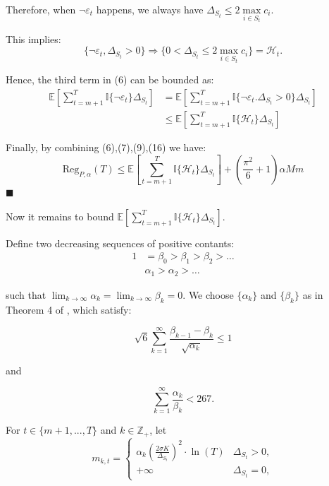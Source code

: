 \documentclass[opre,sglanonrev]{informs4}
\begin{document}
Therefore, when $\lnot \varepsilon_t$ happens, we always have $\Delta_{S_t}\leq 2\mathop{\max}\limits_{i\in S_t}c_i$.

This implies:
$$
	\{\lnot \varepsilon_t, \Delta_{S_t}>0\}\Longrightarrow \{0<\Delta_{S_t}\leq 2\mathop{\max}\limits_{i\in S_t}c_i\}=\mathcal{H}_t.
$$

Hence, the third term in (6) can be bounded as:
\begin{equation}
	\begin{aligned}
		\mathbb{E}[\sum_{t=m+1}^{T}\mathbb{I}\{\lnot \varepsilon_t\}\Delta_{S_t}] &= \mathbb{E}[\sum_{t=m+1}^{T}\mathbb{I}\{\lnot \varepsilon_t. \Delta_{S_t}>0\}\Delta_{S_t}]\\
		&\leq \mathbb{E}[\sum_{t=m+1}^{T}\mathbb{I}\{\mathcal{H}_t\}\Delta_{S_t}]
	\end{aligned}
\end{equation}

Finally, by combining (6),(7),(9),(16) we have:
$$
	\text{Reg}_{P,\alpha}(T) \leq \mathbb{E}[\sum_{t=m+1}^{T}\mathbb{I}\{\mathcal{H}_t\}\Delta_{S_t}] + (\frac{\pi^2}{6}+1)\alpha M m
$$
\hfill $\blacksquare$

Now it remains to bound $\mathbb{E}[\sum_{t=m+1}^{T}\mathbb{I}\{\mathcal{H}_t\}\Delta_{S_t}]$.

Define two decreasing sequences of positive contants:
$$\begin{aligned}
1 & =\beta_0>\beta_1>\beta_2>\ldots \\
 & \alpha_1>\alpha_2>\ldots
\end{aligned}$$

such that $\lim_{k \to \infty}\alpha_k = \lim_{k \to \infty}\beta_k=0$. We choose $\{\alpha_k\}$ and $\{\beta_k\}$ as in Theorem 4 of \citep{Kveton2014TightRB}, which satisfy:

\begin{equation}\sqrt{6}\sum_{k=1}^\infty\frac{\beta_{k-1}-\beta_k}{\sqrt{\alpha_k}}\leq1\end{equation}

and

\begin{equation}\sum_{k=1}^\infty\frac{\alpha_k}{\beta_k}<267.\end{equation}

For $t \in \{m+1,...,T\}$ and $k \in \mathbb{Z}_+$, let
$$m_{k,t}=
\begin{cases}
\alpha_k\left(\frac{2\sigma K}{\Delta_{S_t}}\right)^2\cdot \ln(T) & \Delta_{S_t}>0, \\
+\infty & \Delta_{S_t}=0,
\end{cases}$$
\end{document}
